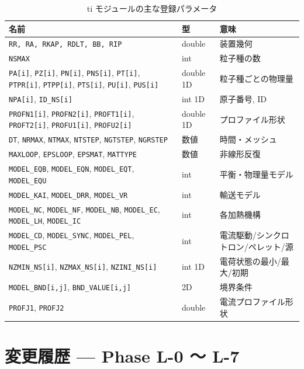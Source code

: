 \documentclass[11pt,a4paper]{report}
\begin{document}
\begin{longtable}{@{}p{3cm}p{2.2cm}p{9.2cm}@{}}
\caption{ti モジュールの主な登録パラメータ}\\
\toprule
\textbf{名前} & \textbf{型} & \textbf{意味} \\ \midrule \endhead
\texttt{RR, RA, RKAP, RDLT, BB, RIP} & double & 装置幾何 \\
\texttt{NSMAX}          & int       & 粒子種の数 \\
\texttt{PA[i]}, \texttt{PZ[i]}, \texttt{PN[i]}, \texttt{PNS[i]}, \texttt{PT[i]}, \texttt{PTPR[i]}, \texttt{PTPP[i]}, \texttt{PTS[i]}, \texttt{PU[i]}, \texttt{PUS[i]} & double 1D & 粒子種ごとの物理量 \\
\texttt{NPA[i]}, \texttt{ID\_NS[i]} & int 1D & 原子番号, ID \\
\texttt{PROFN1[i]}, \texttt{PROFN2[i]}, \texttt{PROFT1[i]}, \texttt{PROFT2[i]}, \texttt{PROFU1[i]}, \texttt{PROFU2[i]} & double 1D & プロファイル形状 \\
\texttt{DT}, \texttt{NRMAX}, \texttt{NTMAX}, \texttt{NTSTEP}, \texttt{NGTSTEP}, \texttt{NGRSTEP} & 数値 & 時間・メッシュ \\
\texttt{MAXLOOP}, \texttt{EPSLOOP}, \texttt{EPSMAT}, \texttt{MATTYPE} & 数値 & 非線形反復 \\
\texttt{MODEL\_EQB}, \texttt{MODEL\_EQN}, \texttt{MODEL\_EQT}, \texttt{MODEL\_EQU} & int & 平衡・物理量モデル \\
\texttt{MODEL\_KAI}, \texttt{MODEL\_DRR}, \texttt{MODEL\_VR} & int & 輸送モデル \\
\texttt{MODEL\_NC}, \texttt{MODEL\_NF}, \texttt{MODEL\_NB}, \texttt{MODEL\_EC}, \texttt{MODEL\_LH}, \texttt{MODEL\_IC} & int & 各加熱機構 \\
\texttt{MODEL\_CD}, \texttt{MODEL\_SYNC}, \texttt{MODEL\_PEL}, \texttt{MODEL\_PSC} & int & 電流駆動/シンクロトロン/ペレット/源 \\
\texttt{NZMIN\_NS[i]}, \texttt{NZMAX\_NS[i]}, \texttt{NZINI\_NS[i]} & int 1D & 電荷状態の最小/最大/初期 \\
\texttt{MODEL\_BND[i,j]}, \texttt{BND\_VALUE[i,j]} & 2D & 境界条件 \\
\texttt{PROFJ1}, \texttt{PROFJ2} & double & 電流プロファイル形状 \\
\bottomrule
\end{longtable}

\section{変更履歴 — Phase L-0 〜 L-7}
\end{document}
